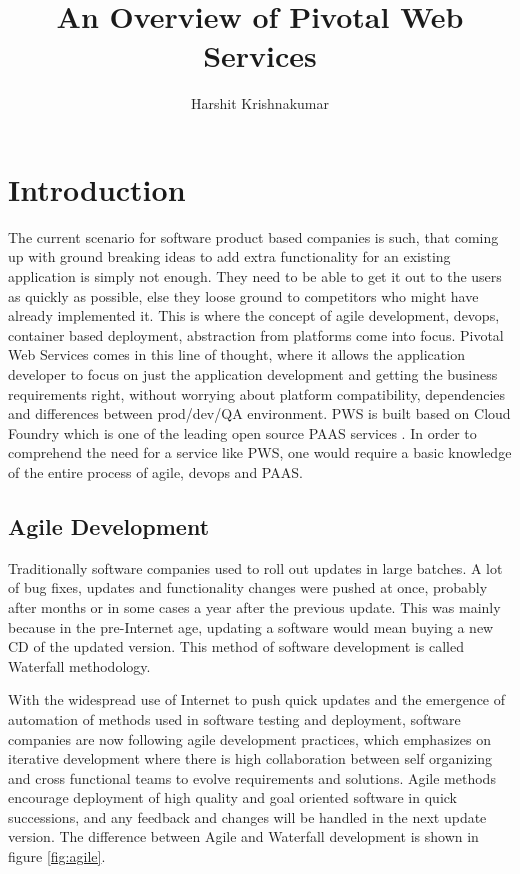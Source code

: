 \documentclass[9pt,twocolumn,twoside]{../../styles/osajnl}
\title{An Overview of Pivotal Web Services}
\author[1,*]{Harshit Krishnakumar}
\affil[1]{School of Informatics and Computing, Bloomington, IN 47408, U.S.A.}
\affil[*]{Corresponding authors: harkrish@iu.edu, S17-IR-2014}
\begin{document}
\maketitle

\section{Introduction}

The current scenario for software product based companies is such, that coming up with ground breaking ideas to add extra functionality for an existing application is simply not enough. They need to be able to get it out to the users as quickly as possible, else they loose ground to competitors who might have already implemented it. This is where the concept of agile development, devops, container based deployment, abstraction from platforms come into focus. Pivotal Web Services comes in this line of thought, where it allows the application developer to focus on just the application development and getting the business requirements right, without worrying about platform compatibility, dependencies and differences between prod/dev/QA environment. PWS is built based on Cloud Foundry which is one of the leading open source PAAS services \cite{www-pivotal}. In order to comprehend the need for a service like PWS, one would require a basic knowledge of the entire process of agile, devops and PAAS.
\subsection{Agile Development}
Traditionally software companies used to roll out updates in large batches. A lot of bug fixes, updates and functionality changes were pushed at once, probably after months or in some cases a year after the previous update. This was mainly because in the pre-Internet age, updating a software would mean buying a new CD of the updated version. This method of software development is called Waterfall methodology.

With the widespread use of Internet to push quick updates and the emergence of automation of methods used in software testing and deployment, software companies are now following agile development practices, which emphasizes on iterative development where there is high collaboration between self organizing and cross functional teams to evolve requirements and solutions. Agile methods encourage deployment of high quality and goal oriented software in quick successions, and any feedback and changes will be handled in the next update version. The difference between Agile and Waterfall development is shown in figure \ref{fig:agile}.
\end{document}
